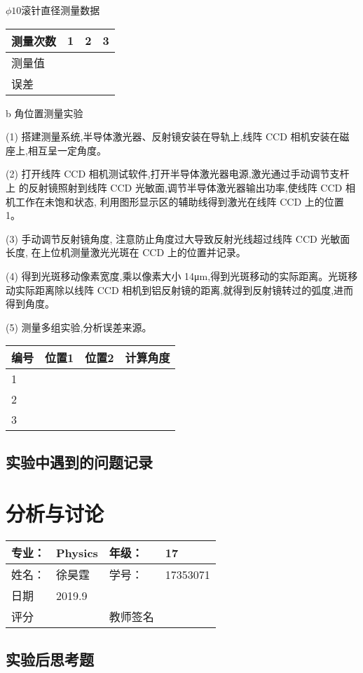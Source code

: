\documentclass{ctexart}
\begin{document}
$\phi 10$滚针直径测量数据

\begin{tabular}{|p{5em}|p{5em}|p{5em}|p{5em}|}
	\hline 
        测量次数 & 1& 2&3     \\
	\hline
	测量值 & & &  \\
	\hline
	误差 & & &  \\
	\hline	
\end{tabular}

b 角位置测量实验

(1) 搭建测量系统,半导体激光器、反射镜安装在导轨上,线阵 CCD 相机安装在磁座上,相互呈一定角度。

(2) 打开线阵 CCD 相机测试软件,打开半导体激光器电源,激光通过手动调节支杆上
的反射镜照射到线阵 CCD 光敏面,调节半导体激光器输出功率,使线阵 CCD 相
机工作在未饱和状态,
利用图形显示区的辅助线得到激光在线阵 CCD 上的位置 1。

(3) 手动调节反射镜角度,
注意防止角度过大导致反射光线超过线阵 CCD 光敏面长度,
在上位机测量激光光斑在 CCD 上的位置并记录。

(4) 得到光斑移动像素宽度,乘以像素大小 14μm,得到光斑移动的实际距离。光斑移
动实际距离除以线阵 CCD 相机到铝反射镜的距离,就得到反射镜转过的弧度,进而得到角度。

(5) 测量多组实验,分析误差来源。

\begin{tabular}{|p{5em}|p{5em}|p{5em}|p{5em}|}
	\hline 
        编号 & 位置1& 位置2&计算角度     \\
	\hline
	1& & &  \\
	\hline
	2 & & &  \\
	\hline
	3 & & &  \\
	\hline
\end{tabular}

\subsection{实验中遇到的问题记录}
\newpage
\section{分析与讨论}
\begin{tabular}{|p{8em}|p{8em}|p{8em}|p{8em}|}
	\hline 
	专业：     &Physics       &年级：      & 17     \\
	\hline
	姓名：& 徐昊霆 &学号：&17353071  \\
	\hline
	日期&     2019.9               & &  \\
	\hline	
	评分 & & 教师签名 & \\
	\hline
\end{tabular}



\subsection{实验后思考题}



\end{document}
